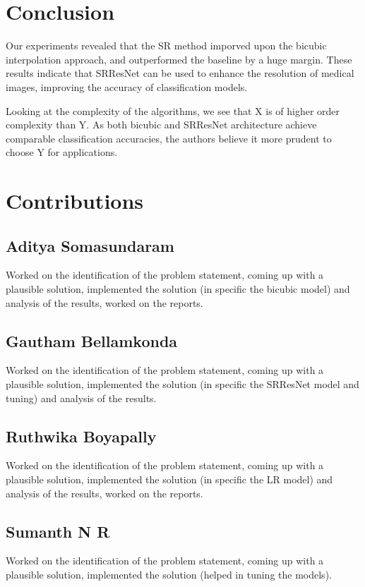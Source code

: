 \documentclass[10pt,twocolumn,letterpaper]{article}
\begin{document}
\section{Conclusion}
Our experiments revealed that the SR method imporved upon the bicubic interpolation approach, and outperformed the baseline by a huge margin. These results indicate that SRResNet can be used to enhance the resolution of medical images, improving the accuracy of classification models.

Looking at the complexity of the algorithms, we see that X is of higher order complexity than Y. As both bicubic and SRResNet architecture achieve comparable classification accuracies, the authors believe it more prudent to choose Y for applications.

\section{Contributions}
\subsection{Aditya Somasundaram}
Worked on the identification of the problem statement, coming up with a plausible solution, implemented the solution (in specific the bicubic model) and analysis of the results, worked on the reports.

\subsection{Gautham Bellamkonda}
Worked on the identification of the problem statement, coming up with a plausible solution, implemented the solution (in specific the SRResNet model and tuning) and analysis of the results.

\subsection{Ruthwika Boyapally}
Worked on the identification of the problem statement, coming up with a plausible solution, implemented the solution (in specific the LR model) and analysis of the results, worked on the reports.

\subsection{Sumanth N R}
Worked on the identification of the problem statement, coming up with a plausible solution, implemented the solution (helped in tuning the models).
\end{document}
